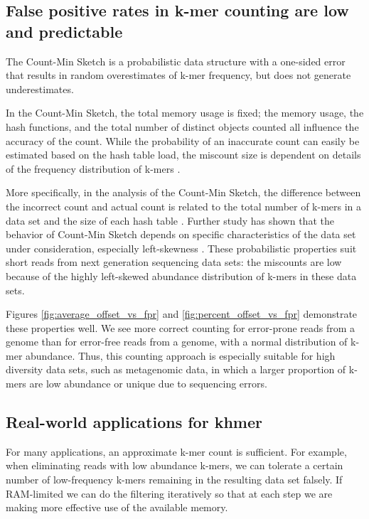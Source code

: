 \subsection{False positive rates in k-mer counting are low and predictable}

The Count-Min Sketch is a probabilistic data structure with a one-sided
error that results in random overestimates of k-mer frequency, but
does not generate underestimates.

In the Count-Min Sketch, the total memory usage is fixed; the memory
usage, the hash functions, and the total number of distinct objects
counted all influence the accuracy of the count.  While the
probability of an inaccurate count can easily be estimated based on
the hash table load, the miscount size is dependent on details of the
frequency distribution of k-mers \cite{Cormode2005}.

More specifically, in the analysis of the Count-Min Sketch, the
difference between the incorrect count and actual count is related to
the total number of k-mers in a data set and the size of each hash
table \cite{Cormode2005}. Further study has shown that the behavior of
Count-Min Sketch depends on specific characteristics of the data set
under consideration, especially left-skewness \cite{Rusu2008,
  CormodeM05}.  These probabilistic properties suit short reads from
next generation sequencing data sets: the miscounts are low because of
the highly left-skewed abundance distribution of k-mers in these data
sets.

Figures \ref{fig:average_offset_vs_fpr} and
\ref{fig:percent_offset_vs_fpr} demonstrate these properties well.  We
see more correct counting for error-prone reads from a genome than for
error-free reads from a genome, with a normal distribution of k-mer
abundance.  Thus, this counting approach is especially suitable for
high diversity data sets, such as metagenomic data, in which a larger
proportion of k-mers are low abundance or unique due to sequencing
errors.

\subsection{Real-world applications for khmer}

For many applications, an approximate k-mer count is sufficient.  For
example, when eliminating reads with low abundance k-mers, we can
tolerate a certain number of low-frequency k-mers remaining in the
resulting data set falsely.  If RAM-limited we can do the filtering
iteratively so that at each step we are making more effective use of
the available memory.

